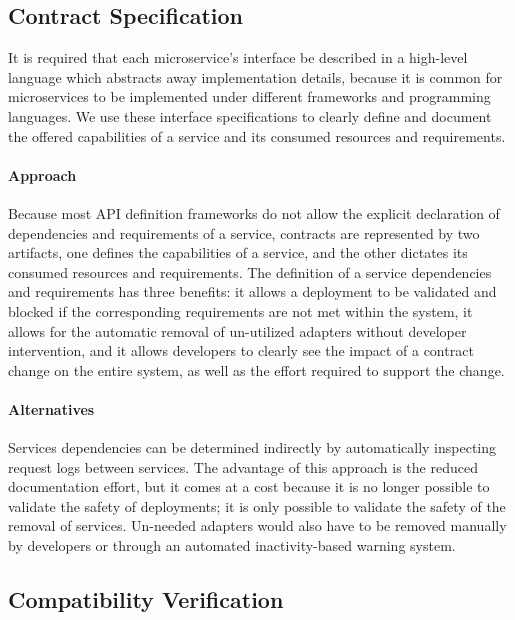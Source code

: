\subsection{Contract Specification} %
\label{sec:contract_specification}

It is required that each microservice’s interface be
described in a high-level language which abstracts away implementation details, because it is common
for microservices to be implemented under different frameworks and programming languages.
We use these interface specifications to clearly define and document the offered capabilities of a service and its consumed resources and requirements.

\paragraph{Approach}
Because most API definition frameworks do not allow the explicit declaration of dependencies and requirements of a service,
contracts are represented by two artifacts, one defines the capabilities of a service, and the other dictates its consumed resources and requirements.
The definition of a service dependencies and requirements has three benefits: it allows a deployment to be validated and blocked if the corresponding requirements are not met within the system,
it allows for the automatic removal of un-utilized adapters without developer intervention,
and it allows developers to clearly see the impact of a contract change on the entire system, as well as the effort required to support the change.

\paragraph{Alternatives}
Services dependencies can be determined indirectly by automatically inspecting request logs between services.
The advantage of this approach is the reduced documentation effort, but it comes at a cost because
it is no longer possible to validate the safety of deployments;
it is only possible to validate the safety of the removal of services.
Un-needed adapters would also have to be removed manually by developers or through an automated inactivity-based warning system.

\subsection{Compatibility Verification} %
\label{sec:compatibility_verification}

